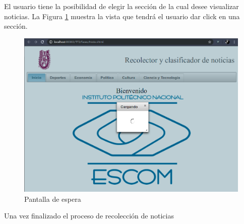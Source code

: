 El usuario tiene la posibilidad de elegir la sección de la cual desee visualizar noticias. La Figura \ref{fig:loading} muestra la vista que tendrá el usuario dar click en una sección.

\begin{figure}[ht]
\centering
\includegraphics[scale=0.3]{imagenes/Capitulo5/cargando.png}
\caption{Pantalla de espera}
\label{fig:loading}
\end{figure}

Una vez finalizado el proceso de recolección de noticias


